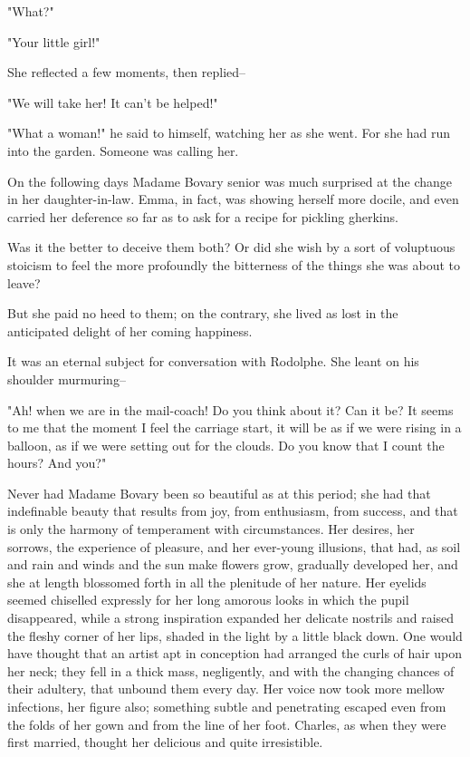 \documentclass{tufte-book}
\begin{document}
"What?"

"Your little girl!"

She reflected a few moments, then replied--

"We will take her! It can't be helped!"

"What a woman!" he said to himself, watching her as she went. For she
had run into the garden. Someone was calling her.

On the following days Madame Bovary senior was much surprised at the
change in her daughter-in-law. Emma, in fact, was showing herself more
docile, and even carried her deference so far as to ask for a recipe for
pickling gherkins.

Was it the better to deceive them both? Or did she wish by a sort of
voluptuous stoicism to feel the more profoundly the bitterness of the
things she was about to leave?

But she paid no heed to them; on the contrary, she lived as lost in the
anticipated delight of her coming happiness.

It was an eternal subject for conversation with Rodolphe. She leant on
his shoulder murmuring--

"Ah! when we are in the mail-coach! Do you think about it? Can it be? It
seems to me that the moment I feel the carriage start, it will be as if
we were rising in a balloon, as if we were setting out for the clouds.
Do you know that I count the hours? And you?"

Never had Madame Bovary been so beautiful as at this period; she had
that indefinable beauty that results from joy, from enthusiasm, from
success, and that is only the harmony of temperament with circumstances.
Her desires, her sorrows, the experience of pleasure, and her ever-young
illusions, that had, as soil and rain and winds and the sun make flowers
grow, gradually developed her, and she at length blossomed forth in all
the plenitude of her nature. Her eyelids seemed chiselled expressly for
her long amorous looks in which the pupil disappeared, while a strong
inspiration expanded her delicate nostrils and raised the fleshy corner
of her lips, shaded in the light by a little black down. One would have
thought that an artist apt in conception had arranged the curls of hair
upon her neck; they fell in a thick mass, negligently, and with the
changing chances of their adultery, that unbound them every day. Her
voice now took more mellow infections, her figure also; something subtle
and penetrating escaped even from the folds of her gown and from the
line of her foot. Charles, as when they were first married, thought her
delicious and quite irresistible.
\end{document}
